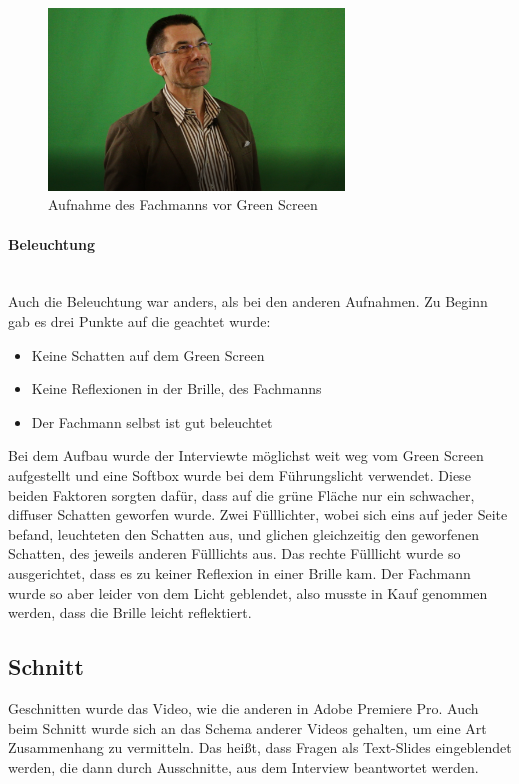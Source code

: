 \begin{figure}[H] 
  \centering
     \includegraphics[width=0.7\textwidth]{video_abb1.png}
  \caption{Aufnahme des Fachmanns vor Green Screen}
\end{figure}

\paragraph{Beleuchtung}
\leavevmode \\
Auch die Beleuchtung war anders, als bei den anderen Aufnahmen. Zu Beginn gab es drei Punkte auf die geachtet wurde:
\begin{itemize}
\item Keine Schatten auf dem Green Screen
\item Keine Reflexionen in der Brille, des Fachmanns
\item Der Fachmann selbst ist gut beleuchtet 
\end{itemize}
Bei dem Aufbau wurde der Interviewte möglichst weit weg vom Green Screen aufgestellt und eine Softbox wurde bei dem Führungslicht verwendet. Diese beiden Faktoren sorgten dafür, dass auf die grüne Fläche nur ein schwacher, diffuser Schatten geworfen wurde. Zwei Fülllichter, wobei sich eins auf jeder Seite befand, leuchteten den Schatten aus, und glichen gleichzeitig den geworfenen Schatten, des jeweils anderen Fülllichts aus. Das rechte Fülllicht wurde so ausgerichtet, dass es zu keiner Reflexion in einer Brille kam. Der Fachmann wurde so aber leider von dem Licht geblendet, also musste in Kauf genommen werden, dass die Brille leicht reflektiert.
\subsection{Schnitt}
Geschnitten wurde das Video, wie die anderen in Adobe Premiere Pro. Auch beim Schnitt wurde sich an das Schema anderer Videos gehalten, um eine Art Zusammenhang zu vermitteln. Das heißt, dass Fragen als Text-Slides eingeblendet werden, die dann durch Ausschnitte, aus dem Interview beantwortet werden.
